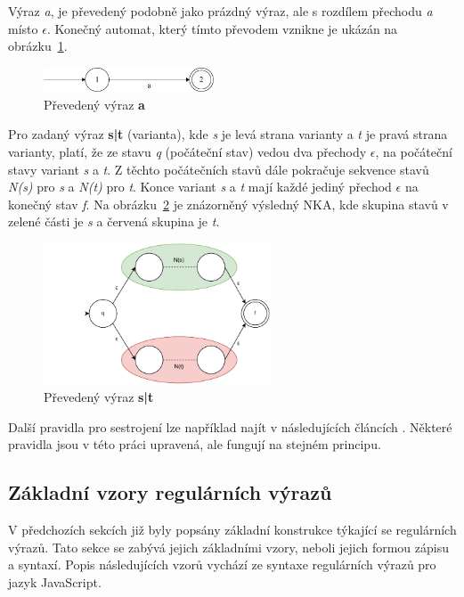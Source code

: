 Výraz \textit{a}, je převedený podobně jako prázdný výraz, ale s rozdílem přechodu \textit{a} místo \textit{$\epsilon$}.
Konečný automat, který tímto převodem vznikne je ukázán na obrázku~\ref{fig:NFAa}.
\begin{figure}[!h]
	\centering
	\includegraphics[width=0.45\textwidth]{Figures/NFA_a.pdf}
	\caption{Převedený výraz \textbf{a}}
	\label{fig:NFAa}
\end{figure}

Pro zadaný výraz \textbf{s|t} (varianta), kde \textit{s} je levá strana varianty a \textit{t} je pravá strana varianty, platí, že ze stavu \textit{q} (počáteční stav) vedou dva přechody
\textit{$\epsilon$}, na počáteční stavy variant \textit{s} a \textit{t}. 
Z těchto počátečních stavů dále pokračuje sekvence stavů \textit{N(s)} pro \textit{s} a \textit{N(t)} pro \textit{t}.
Konce variant \textit{s} a \textit{t} mají každé jediný přechod \textit{$\epsilon$} na konečný stav \textit{f}.
Na obrázku~\ref{fig:NFAunion} je znázorněný výsledný NKA, kde skupina stavů v zelené části je \textit{s} a červená skupina je \textit{t}.
\begin{figure}[!h]
	\centering
	\includegraphics[width=0.6\textwidth]{Figures/NFA_union.pdf}
	\caption{Převedený výraz \textbf{s|t}}
	\label{fig:NFAunion}
\end{figure}

Další pravidla pro sestrojení lze například najít v následujících článcích \cite{Thompson1,Thompson2}.
Některé pravidla jsou v této práci upravená, ale fungují na stejném principu.

\subsection*{Základní vzory regulárních výrazů}
V předchozích sekcích již byly popsány základní konstrukce týkající se regulárních výrazů.
Tato sekce se zabývá jejich základními vzory, neboli jejich formou zápisu a syntaxí.
Popis následujících vzorů vychází ze syntaxe regulárních výrazů pro jazyk JavaScript.


